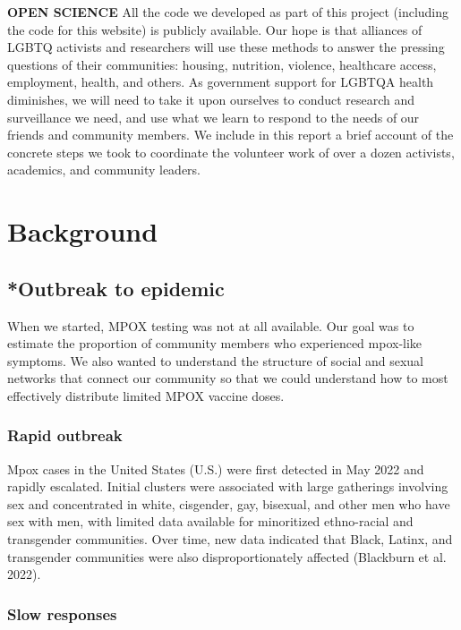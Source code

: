 \documentclass[
  letterpaper,
  DIV=11,
  numbers=noendperiod,
  oneside]{scrreprt}
\begin{document}
\leavevmode{}%
\textbf{OPEN SCIENCE} All the code we developed as part of this project
(including the code for this website) is publicly available. Our hope is
that alliances of LGBTQ activists and researchers will use these methods
to answer the pressing questions of their communities: housing,
nutrition, violence, healthcare access, employment, health, and others.
As government support for LGBTQA health diminishes, we will need to take
it upon ourselves to conduct research and surveillance we need, and use
what we learn to respond to the needs of our friends and community
members. We include in this report a brief account of the concrete steps
we took to coordinate the volunteer work of over a dozen activists,
academics, and community leaders.

\part{Background}

\hypertarget{outbreak-to-epidemic}{%
\chapter{*Outbreak to epidemic}\label{outbreak-to-epidemic}}

When we started, MPOX testing was not at all available. Our goal was to
estimate the proportion of community members who experienced mpox-like
symptoms. We also wanted to understand the structure of social and
sexual networks that connect our community so that we could understand
how to most effectively distribute limited MPOX vaccine doses.

\hypertarget{rapid-outbreak}{%
\section{Rapid outbreak}\label{rapid-outbreak}}

Mpox cases in the United States (U.S.) were first detected in May 2022
and rapidly escalated. Initial clusters were associated with large
gatherings involving sex and concentrated in white, cisgender, gay,
bisexual, and other men who have sex with men, with limited data
available for minoritized ethno-racial and transgender communities. Over
time, new data indicated that Black, Latinx, and transgender communities
were also disproportionately affected (Blackburn et al. 2022).

\hypertarget{slow-responses}{%
\section{Slow responses}\label{slow-responses}}
\end{document}

